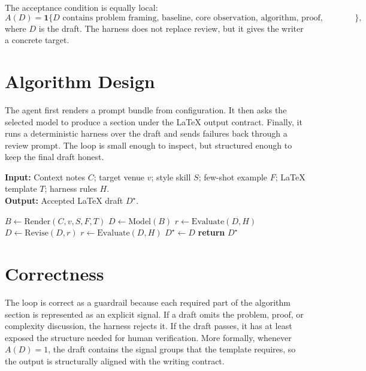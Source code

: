 \documentclass[11pt]{article}
\begin{document}
The acceptance condition is equally local:
\begin{equation}\label{eq:accept}
A(D)=\mathbf{1}\{\text{$D$ contains problem framing, baseline, core observation, algorithm, proof, complexity, and edge cases}\},
\end{equation}
where $D$ is the draft. The harness does not replace review, but it gives the writer a concrete target.

\section{Algorithm Design}
The agent first renders a prompt bundle from configuration. It then asks the selected model to produce a section under the LaTeX output contract. Finally, it runs a deterministic harness over the draft and sends failures back through a review prompt. The loop is small enough to inspect, but structured enough to keep the final draft honest.

\begin{algorithm}[tb]
\small
\caption{Paper Section Drafting Loop}
\label{alg:draft-loop}
\begin{flushleft}
\hspace*{0.02in} \textbf{Input:}
Context notes $C$;
target venue $v$;
style skill $S$;
few-shot example $F$;
LaTeX template $T$;
harness rules $H$.\\
\hspace*{0.02in} \textbf{Output:}
Accepted LaTeX draft $D^{\star}$.
\end{flushleft}
\begin{algorithmic}[1]
    \State $B \gets \mathrm{Render}(C, v, S, F, T)$
    \State $D \gets \mathrm{Model}(B)$
    \State $r \gets \mathrm{Evaluate}(D, H)$
        \State $D \gets \mathrm{Revise}(D, r)$
        \State $r \gets \mathrm{Evaluate}(D, H)$
    \EndWhile
    \State $D^{\star} \gets D$
    \State \textbf{return} $D^{\star}$
\end{algorithmic}
\end{algorithm}

\section{Correctness}
The loop is correct as a guardrail because each required part of the algorithm section is represented as an explicit signal. If a draft omits the problem, proof, or complexity discussion, the harness rejects it. If the draft passes, it has at least exposed the structure needed for human verification. More formally, whenever $A(D)=1$, the draft contains the signal groups that the template requires, so the output is structurally aligned with the writing contract.
\end{document}
